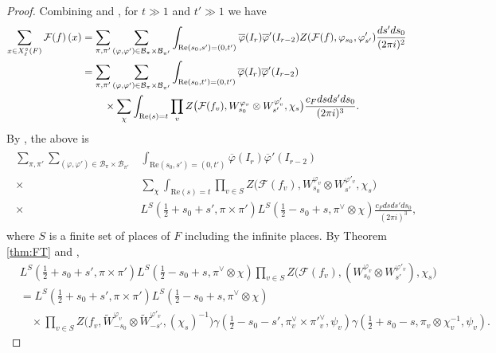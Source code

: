 \documentclass[12pt]{amsart}
\theoremstyle{remark}
\numberwithin{equation}{section}
\theoremstyle{definition}
\numberwithin{equation}{subsection}
\begin{document}
\begin{proof} 
    Combining  and , for $t\gg 1$ and  $t'\gg 1$ we have 
    \begin{align*}
        \sum_{x \in X_{\ell}^{\circ}(F)}\mathcal{F}(f)\left(x\right)         &=\sum_{\pi,\pi'}\sum_{(\varphi,\varphi') \in \mathcal{B}_{\pi} \times \mathcal{B}_{\pi'}}\int_{\mathrm{Re}(s_0,s')=(0,t')}\overline{\varphi}(I_r)\overline{\varphi}'(I_{r-2})Z(\mathcal{F}(f),\varphi_{s_0},\varphi'_{s'}) \frac{ ds'ds_0}{(2\pi i)^2}\\
        &=\sum_{\pi,\pi'}\sum_{(\varphi,\varphi') \in \mathcal{B}_{\pi} \times \mathcal{B}_{\pi'}}\int_{\mathrm{Re}(s_0,t')=(0,t')}\overline{\varphi}(I_r)\overline{\varphi}'(I_{r-2})\\
        &\hspace{0.3in} \times \sum_{\chi}\int_{\mathrm{Re}(s)=t}\prod_{v}Z\big(\mathcal{F}(f_v),W^{\varphi_v}_{s_0}\otimes W^{\varphi'_v}_{s'},\chi_{s}\big) \frac{c_F ds ds'ds_0}{(2\pi i)^3}. 
    \end{align*}
By , the above is 
\begin{align} \label{before:fix:pi} \begin{split}
\sum_{\pi,\pi'}\sum_{(\varphi,\varphi') \in \mathcal{B}_{\pi} \times \mathcal{B}_{\pi'}}&\int_{\mathrm{Re}(s_0,s')=(0,t')}\overline{\varphi}(I_r)\overline{\varphi}'(I_{r-2})\\
   \times & \sum_{\chi}\int_{\mathrm{Re}(s)=t}\prod_{v\in S}Z\big(\mathcal{F}(f_v),W^{\varphi_v}_{s_0} \otimes W^{\varphi'_v}_{s'},\chi_{s}\big)\\
       \times &  L^S(\tfrac{1}{2}+s_0+s',\pi\times \pi') L^S(\tfrac{1}{2}-s_0+s,\pi^{\vee}\otimes \chi )\frac{c_F ds ds'ds_0}{(2\pi i)^3}, \end{split}
\end{align}
where $S$ is a finite set of places of $F$ including the infinite places.  By Theorem \ref{thm:FT} and , 
\begin{align*}
&L^S(\tfrac{1}{2}+s_0+s',\pi\times \pi') L^S(\tfrac{1}{2}-s_0+s,\pi^{\vee}\otimes \chi)\prod_{v\in S}Z\big(\mathcal{F}(f_v),(W^{\varphi_v}_{s_0} \otimes W^{\varphi'_v}_{s'}),\chi_{s}\big)\\
&=L^S(\tfrac{1}{2}+s_0+s',\pi \times \pi') 
        L^S(\tfrac{1}{2}-s_0+s,\pi^{\vee}\otimes \chi )\\
        &\quad\times\prod_{v\in S}Z\big(f_v,\widetilde{W}^{\varphi_v}_{-s_0} \otimes \widetilde{W}^{\varphi'_v}_{-s'},(\chi_{s})^{-1}\big) \gamma(\tfrac{1}{2}-s_0-s',\pi^{\vee}_v\times \pi'^{\vee}_v,\psi_v)\gamma(\tfrac{1}{2}+s_0-s,\pi_{v}\otimes\chi^{-1}_v,\psi_v).

\end{align*}
\end{proof}
\end{document}

